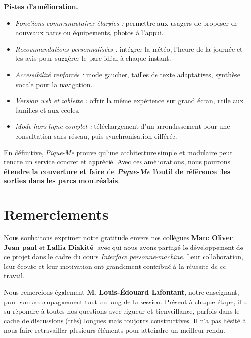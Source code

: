 \documentclass[12pt,a4paper]{article}
\begin{document}
\medskip\noindent
\textbf{Pistes d'amélioration.}  
\begin{itemize}
  \item \emph{Fonctions communautaires élargies :} permettre aux usagers de proposer de nouveaux parcs ou équipements, photos à l'appui.
  \item \emph{Recommandations personnalisées :} intégrer la météo, l'heure de la journée et les avis pour suggérer le parc idéal à chaque instant.
  \item \emph{Accessibilité renforcée :} mode gaucher, tailles de texte adaptatives, synthèse vocale pour la navigation.
  \item \emph{Version web et tablette :} offrir la même expérience sur grand écran, utile aux familles et aux écoles.
  \item \emph{Mode hors-ligne complet :} téléchargement d'un arrondissement pour une consultation sans réseau, puis synchronisation différée.
\end{itemize}

\medskip\noindent
En définitive, \textit{Pique-Me} prouve qu'une architecture simple et modulaire peut rendre un service concret et apprécié. Avec ces améliorations, nous pourrons \textbf{étendre la couverture et faire de \textit{Pique-Me} l'outil de référence des sorties dans les parcs montréalais}.


\clearpage
\section*{Remerciements}

Nous souhaitons exprimer notre gratitude envers nos collègues \textbf{Marc Oliver Jean paul} et \textbf{Lallia Diakité}, avec qui nous avons partagé le développement de ce projet dans le cadre du cours \textit{Interface personne-machine}. Leur collaboration, leur écoute et leur motivation ont grandement contribué à la réussite de ce travail.

Nous remercions également \textbf{M. Louis-Édouard Lafontant}, notre enseignant, pour son accompagnement tout au long de la session. Présent à chaque étape, il a su répondre à toutes nos questions avec rigueur et bienveillance, parfois dans le cadre de discussions (très) longues mais toujours constructives. Il n'a pas hésité à nous faire retravailler plusieurs éléments pour atteindre un meilleur rendu.
\end{document}
